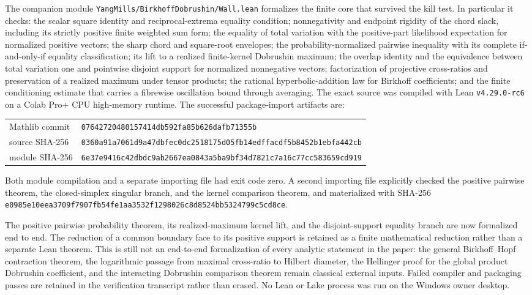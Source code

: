 \documentclass[11pt]{article}
\newcommand{\1}{\mathbf{1}}
\begin{document}
The companion module
\texttt{YangMills/BirkhoffDobrushin/Wall.lean} formalizes the finite core that
survived the kill test.  In particular it checks: the scalar square
identity and reciprocal-extrema equality condition; nonnegativity and endpoint
rigidity of the chord slack, including its strictly positive finite weighted
sum form; the equality of total variation with the positive-part likelihood
expectation for normalized positive vectors; the sharp chord and square-root
envelopes; the probability-normalized pairwise inequality with its complete
if-and-only-if equality classification; its lift to a realized finite-kernel
Dobrushin maximum; the overlap identity and the equivalence between total
variation one and pointwise disjoint support for normalized nonnegative
vectors; factorization of projective cross-ratios and preservation
of a realized maximum under tensor products; the rational hyperbolic-addition
law for Birkhoff coefficients; and the finite conditioning estimate that
carries a fibrewise oscillation bound through averaging.  The exact source was
compiled with Lean \texttt{v4.29.0-rc6} on a Colab Pro+ CPU high-memory
runtime.  The successful package-import artifacts are:
\begin{center}
\scriptsize
\begin{tabular}{@{}ll@{}}
Mathlib commit & \texttt{07642720480157414db592fa85b626dafb71355b} \\
source SHA-256 & \texttt{0360a91a7061d9a47dbfec0dc2518175d05fb14edffacdf5b8452b1ebfa442cb} \\
module SHA-256 & \texttt{6e37e9416c42dbdc9ab2667ea0843a5ba9bf34d7821c7a16c77cc583659cd919}
\end{tabular}
\end{center}
Both module compilation and a separate importing file had exit code zero.  A
second importing file explicitly checked the positive pairwise theorem, the
closed-simplex singular branch, and the kernel comparison theorem, and
materialized with SHA-256
\texttt{e0985e10eea3709f7907fb54fe1aa3532\allowbreak{}f1298026c8d8524bb5324799c5cd8ce}.

The positive pairwise probability theorem, its realized-maximum kernel lift,
and the disjoint-support equality branch are now formalized end to end.  The
reduction of a common boundary face to its positive support is retained as a
finite mathematical reduction rather than a separate Lean theorem.  This is
still not an end-to-end formalization of every
analytic statement in the paper: the general Birkhoff--Hopf contraction
theorem, the logarithmic passage from maximal cross-ratio to Hilbert diameter,
the Hellinger proof for the global product Dobrushin coefficient, and the
interacting Dobrushin comparison theorem remain classical external inputs.
Failed compiler and packaging passes are retained in the verification
transcript rather than erased.  No Lean or Lake process was run on the Windows
owner desktop.
\end{document}
